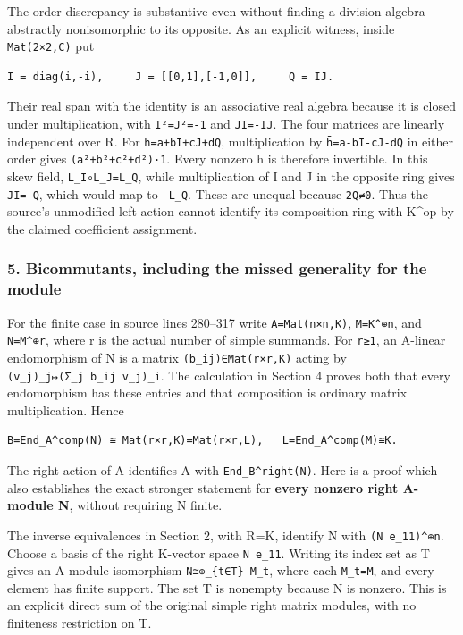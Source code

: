 \documentclass[11pt]{article}
\begin{document}
The order discrepancy is substantive even without finding a division algebra abstractly nonisomorphic to its opposite. As an explicit witness, inside \texttt{Mat(2×2,C)} put

\begin{verbatim}
I = diag(i,-i),     J = [[0,1],[-1,0]],     Q = IJ.
\end{verbatim}

Their real span with the identity is an associative real algebra because it is closed under multiplication, with \texttt{I²=J²=-1} and \texttt{JI=-IJ}. The four matrices are linearly independent over R. For \texttt{h=a+bI+cJ+dQ}, multiplication by \texttt{h̄=a-bI-cJ-dQ} in either order gives \texttt{(a²+b²+c²+d²)·1}. Every nonzero h is therefore invertible. In this skew field, \texttt{L\_I∘L\_J=L\_Q}, while multiplication of I and J in the opposite ring gives \texttt{JI=-Q}, which would map to \texttt{-L\_Q}. These are unequal because \texttt{2Q≠0}. Thus the source's unmodified left action cannot identify its composition ring with K\^{}op by the claimed coefficient assignment.

\subsubsection{5. Bicommutants, including the missed generality for the module}\label{bicommutants-including-the-missed-generality-for-the-module}

For the finite case in source lines 280--317 write \texttt{A=Mat(n×n,K)}, \texttt{M=K\^{}⊕n}, and \texttt{N=M\^{}⊕r}, where r is the actual number of simple summands. For \texttt{r≥1}, an A-linear endomorphism of N is a matrix \texttt{(b\_ij)∈Mat(r×r,K)} acting by \texttt{(v\_j)\_j↦(Σ\_j\ b\_ij\ v\_j)\_i}. The calculation in Section 4 proves both that every endomorphism has these entries and that composition is ordinary matrix multiplication. Hence

\begin{verbatim}
B=End_A^comp(N) ≅ Mat(r×r,K)=Mat(r×r,L),   L=End_A^comp(M)≅K.
\end{verbatim}

The right action of A identifies A with \texttt{End\_B\^{}right(N)}. Here is a proof which also establishes the exact stronger statement for \textbf{every nonzero right A-module N}, without requiring N finite.

The inverse equivalences in Section 2, with R=K, identify N with \texttt{(N\ e\_11)\^{}⊕n}. Choose a basis of the right K-vector space \texttt{N\ e\_11}. Writing its index set as T gives an A-module isomorphism \texttt{N≅⊕\_\{t∈T\}\ M\_t}, where each \texttt{M\_t=M}, and every element has finite support. The set T is nonempty because N is nonzero. This is an explicit direct sum of the original simple right matrix modules, with no finiteness restriction on T.
\end{document}
